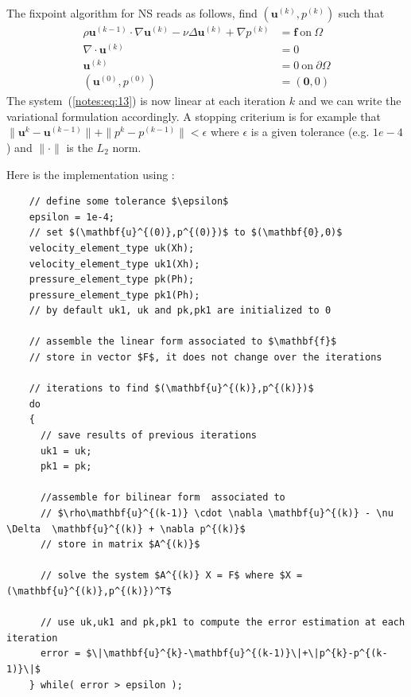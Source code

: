 The fixpoint algorithm for NS reads as follows, find
$(\mathbf{u}^{(k)},p^{(k)})$ such that
    \begin{equation}
      \label{notes:eq:13}
    \begin{split}
      \rho\mathbf{u}^{(k-1)} \cdot \nabla \mathbf{u}^{(k)} - \nu \Delta  \mathbf{u}^{(k)} + \nabla p^{(k)} &= \mathbf{f} \ \text{on}\ \Omega \\
      \nabla \cdot \mathbf{u}^{(k)} &= 0 \\
      \mathbf{u}^{(k)} &= 0\ \text{on}\ \partial \Omega\\
      (\mathbf{u}^{(0)},p^{(0)}) &= (\mathbf{0},0)
    \end{split}
  \end{equation}
  The system~(\ref{notes:eq:13}) is now linear at each iteration $k$ and we
  can write the variational formulation accordingly. A stopping
  criterium is for example that
  $\|\mathbf{u}^{k}-\mathbf{u}^{(k-1)}\|+\|p^{k}-p^{(k-1)}\| <
  \epsilon$ where $\epsilon$ is a given tolerance (e.g. $1e-4$) and
  $\|\cdot\|$ is the $L_2$ norm.

  Here is the implementation using \Feel:

  \begin{lstlisting}
    // define some tolerance $\epsilon$
    epsilon = 1e-4;
    // set $(\mathbf{u}^{(0)},p^{(0)})$ to $(\mathbf{0},0)$
    velocity_element_type uk(Xh);
    velocity_element_type uk1(Xh);
    pressure_element_type pk(Ph);
    pressure_element_type pk1(Ph);
    // by default uk1, uk and pk,pk1 are initialized to 0

    // assemble the linear form associated to $\mathbf{f}$
    // store in vector $F$, it does not change over the iterations

    // iterations to find $(\mathbf{u}^{(k)},p^{(k)})$
    do
    {
      // save results of previous iterations
      uk1 = uk;
      pk1 = pk;

      //assemble for bilinear form  associated to
      // $\rho\mathbf{u}^{(k-1)} \cdot \nabla \mathbf{u}^{(k)} - \nu \Delta  \mathbf{u}^{(k)} + \nabla p^{(k)}$
      // store in matrix $A^{(k)}$

      // solve the system $A^{(k)} X = F$ where $X = (\mathbf{u}^{(k)},p^{(k)})^T$

      // use uk,uk1 and pk,pk1 to compute the error estimation at each iteration
      error = $\|\mathbf{u}^{k}-\mathbf{u}^{(k-1)}\|+\|p^{k}-p^{(k-1)}\|$
    } while( error > epsilon );

  \end{lstlisting}

